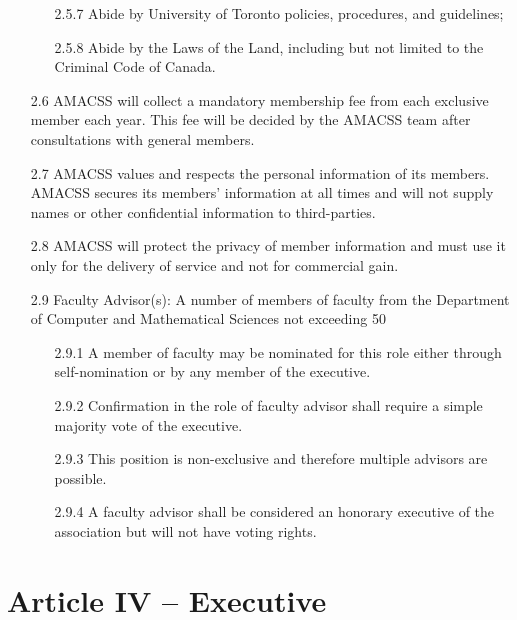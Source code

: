\documentclass[12pt,a4paper]{article}
\begin{document}
\begin{enumerate}
\begin{enumerate}
\item[2.5.7] Abide by University of Toronto policies, procedures, and guidelines;

\item[2.5.8] Abide by the Laws of the Land, including but not limited to the Criminal Code of Canada.
\end{enumerate}

\item[2.6] AMACSS will collect a mandatory membership fee from each exclusive member each year. This fee will be decided by the AMACSS team after consultations with general members.

\item[2.7] AMACSS values and respects the personal information of its members. AMACSS secures its members' information at all times and will not supply names or other confidential information to third-parties.

\item[2.8] AMACSS will protect the privacy of member information and must use it only for the delivery of service and not for commercial gain.

\item[2.9] Faculty Advisor(s): A number of members of faculty from the Department of Computer and Mathematical Sciences not exceeding 50%

\begin{enumerate}
\item[2.9.1] A member of faculty may be nominated for this role either through self-nomination or by any member of the executive.

\item[2.9.2] Confirmation in the role of faculty advisor shall require a simple majority vote of the executive.

\item[2.9.3] This position is non-exclusive and therefore multiple advisors are possible.

\item[2.9.4] A faculty advisor shall be considered an honorary executive of the association but will not have voting rights.
\end{enumerate}
\end{enumerate}

\section*{Article IV – Executive}
\end{document}
